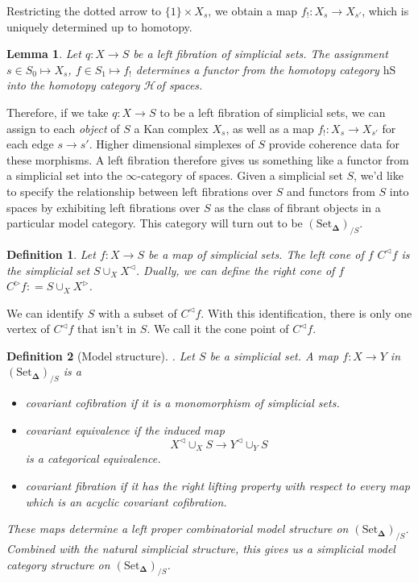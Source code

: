 \documentclass[12pt]{amsart}
\newcommand{\8}{\ensuremath{\infty}}
\renewcommand{\H}{\ensuremath{\mathcal{H}}}
\newcommand{\SSet}{\ensuremath{\text{Set}_{\boldsymbol{\Delta}}}}
\newtheorem{definition}{Definition}
\newtheorem{lemma}{Lemma}
\begin{document}
Restricting the dotted arrow to $\{1\}\times X_s$, we obtain a map $f_!: X_s \rightarrow X_{s'}$, which is uniquely determined up to homotopy.


\begin{lemma}
  Let $q : X \rightarrow S$ be a left fibration of simplicial sets. The assignment $s \in S_0 \mapsto X_s$, $f \in S_1 \mapsto f_!$ determines a functor from the homotopy category $\text{hS}$ into the homotopy category \H of spaces.
\end{lemma}

Therefore, if we take $q: X \rightarrow S$ to be a left fibration of simplicial sets, we can assign to each \emph{object} of $S$ a Kan complex $X_s$, as well as a map $f_{!}: X_s \rightarrow X_{s'}$ for each edge $s \rightarrow s'$. Higher dimensional simplexes of $S$ provide coherence data for these morphisms. A left fibration therefore gives us something like a functor from a simplicial set into the \8-category of spaces. Given a simplicial set $S$, we'd like to specify the relationship between left fibrations over $S$ and functors from $S$ into spaces by exhibiting left fibrations over $S$ as the class of fibrant objects in a particular model category. This category will turn out to be $(\SSet)_{/S}$.

\begin{definition}
  Let $f: X \rightarrow S$ be a map of simplicial sets. The left cone of $f$ $C^
      {\triangleleft}f$ is the simplicial set $\displaystyle S\cup_X X^{\triangleleft} $. Dually, we can define the right cone of $f$ $C^{\triangleright}f: =\displaystyle S\cup_X X^{\triangleright}$.
\end{definition}

We can identify $S$ with a subset of $C^{\triangleleft}f$. With this identification, there is only one vertex of $C^{\triangleleft}f$ that isn't in $S$. We call it the cone point of $C^{\triangleleft}f$.

\begin{definition}[Model structure]. Let $S$ be a simplicial set. A map $f: X \rightarrow Y$ in $(\SSet)_{/S}$ is a
  \begin{itemize}
    \item covariant cofibration if it is a monomorphism of simplicial sets.
    \item covariant equivalence if the induced map \[X^{\triangleleft}\displaystyle \cup_X S \rightarrow Y^{\triangleleft}\cup_Y S\] is a categorical equivalence.
    \item covariant fibration if it has the right lifting property with respect to every map which is an acyclic covariant cofibration.
  \end{itemize}
  These maps determine a left proper combinatorial model structure on $(\SSet)_{/S}$. Combined with the natural simplicial structure, this gives us a simplicial model category structure on $(\SSet)_{/S}$.
\end{definition}
\end{document}
